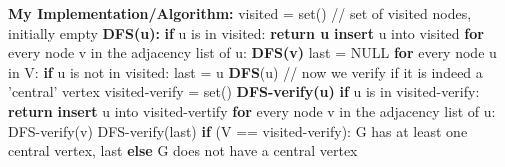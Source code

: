 \documentclass[letterpaper, 11pt]{article}
\begin{document}
\newpage
\noindent\textbf{My Implementation/Algorithm:} \newline
\newline visited = set() // set of visited nodes, initially empty
\newline \textbf{DFS(u):}
\newline \indent\textbf{if} u is in visited:
\newline \indent \indent \textbf{return u}
\newline \indent\textbf{insert} u into visited
\newline \indent\textbf{for} every node v in the adjacency list of u:
\newline \indent \indent \textbf{DFS(v)}
\newline last = NULL
\newline \textbf{for} every node u in V:
\newline \indent \textbf{if} u is not in visited:
\newline \indent \indent last = u
\newline \indent \indent \textbf{DFS}(u)
\newline \newline // now we verify if it is indeed a 'central' vertex
\newline visited-verify = set()
\newline \textbf{DFS-verify(u)}
\newline \indent \textbf{if} u is in visited-verify:
\newline \indent \indent \textbf{return}
\newline \indent \textbf{insert} u into visited-vertify
\newline \indent \textbf{for} every node v in the adjacency list of u:
\newline \indent \indent DFS-verify(v)
\newline \indent DFS-verify(last)
\newline \textbf{if} (V == visited-verify):
\newline \indent G has at least one central vertex, last
\newline \textbf{else} G does not have a central vertex






\newpage
\end{document}
